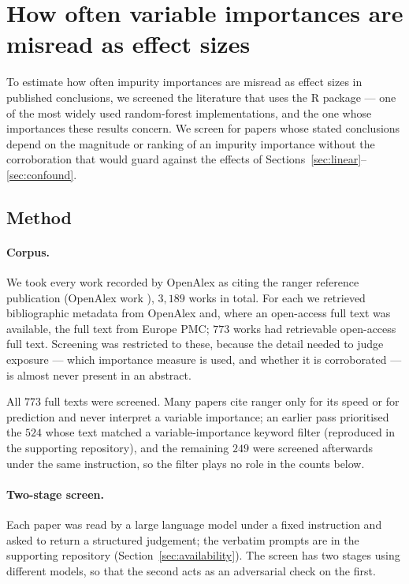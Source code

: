 \section{How often variable importances are misread as effect sizes}

To estimate how
often impurity importances are misread as effect sizes in published conclusions, we screened the literature
that uses the  R package --- one of the most widely used
random-forest implementations, and the one whose importances these results
concern. We screen for papers whose stated conclusions depend on the magnitude
or
ranking of an impurity importance without the corroboration that would guard
against the effects of Sections~\ref{sec:linear}--\ref{sec:confound}.

\subsection{Method}
\label{sec:prevalence-method}

\paragraph{Corpus.} We took every work recorded by OpenAlex as citing the ranger
reference publication \citep{wright2017} (OpenAlex work ),
$3{,}189$ works in total. For each we retrieved bibliographic metadata from
OpenAlex and, where an open-access full text was available, the full text from
Europe PMC; $773$ works had retrievable open-access full text. Screening was
restricted to these, because the detail needed to judge exposure --- which
importance measure is used, and whether it is corroborated --- is almost never
present in an abstract.

All $773$ full texts were screened. Many papers cite ranger only for its speed
or for prediction and never interpret a variable importance; an earlier pass
prioritised the $524$ whose text matched a variable-importance keyword filter
(reproduced in the supporting repository), and the remaining $249$ were screened
afterwards under the same instruction, so the filter plays no role in the counts
below.

\paragraph{Two-stage screen.} Each paper was read by a large language model
under
a fixed instruction and asked to return a structured judgement; the verbatim
prompts are in the supporting repository (Section~\ref{sec:availability}). The
screen has two stages using different models, so that the second acts as an
adversarial check on the first.

